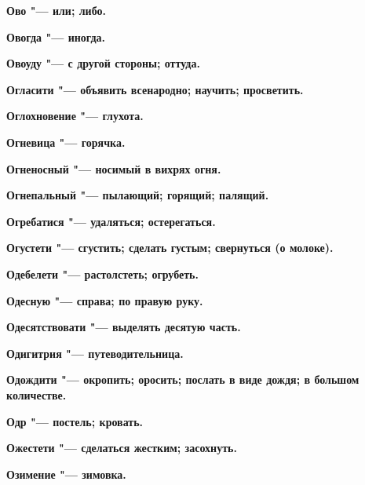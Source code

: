 \begin{mymulticols}{2}
\bfseries Ово\normalfont{} "--- или; либо. 




\bfseries Овогда\normalfont{} "--- иногда. 




\bfseries Овоуду\normalfont{} "--- с другой стороны; оттуда. 




\bfseries Огласити\normalfont{} "--- объявить всенародно; научить; просветить. 




\bfseries Оглохновение\normalfont{} "--- глухота. 




\bfseries Огневица\normalfont{} "--- горячка. 




\bfseries Огненосный\normalfont{} "--- носимый в вихрях огня. 




\bfseries Огнепальный\normalfont{} "--- пылающий; горящий; палящий. 




\bfseries Огребатися\normalfont{} "--- удаляться; остерегаться. 




\bfseries Огустети\normalfont{} "--- сгустить; сделать густым; свернуться (о молоке). 




\bfseries Одебелети\normalfont{} "--- растолстеть; огрубеть. 




\bfseries Одесную\normalfont{} "--- справа; по правую руку. 




\bfseries Одесятствовати\normalfont{} "--- выделять десятую часть. 




\bfseries Одигитрия\normalfont{} "--- путеводительница. 




\bfseries Одождити\normalfont{} "--- окропить; оросить; послать в виде дождя; в большом количестве. 




\bfseries Одр\normalfont{} "--- постель; кровать. 




\bfseries Ожестети\normalfont{} "--- сделаться жестким; засохнуть. 




\bfseries Озимение\normalfont{} "--- зимовка. 





\end{mymulticols}
